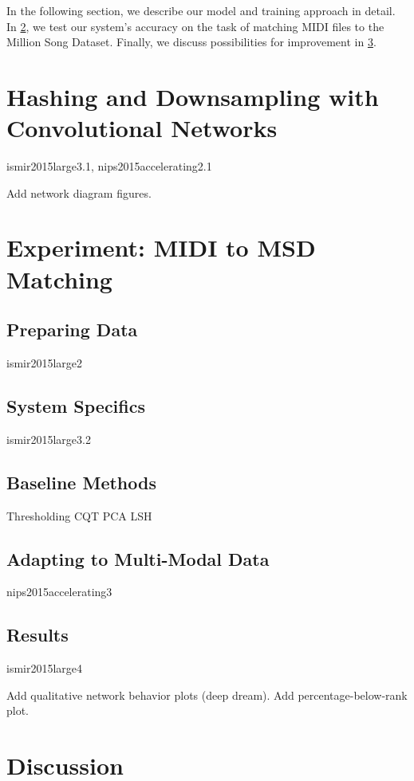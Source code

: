 In the following section, we describe our model and training approach in detail.
In \cref{sec:dhs_experiment}, we test our system's accuracy on the task of matching MIDI files to the Million Song Dataset.
Finally, we discuss possibilities for improvement in \cref{sec:dhs_discussion}.

\section{Hashing and Downsampling with Convolutional Networks}


ismir2015large3.1, nips2015accelerating2.1

Add network diagram figures.

\section{Experiment: MIDI to MSD Matching}
\label{sec:dhs_experiment}

\subsection{Preparing Data}

ismir2015large2

\subsection{System Specifics}

ismir2015large3.2

\subsection{Baseline Methods}

Thresholding CQT PCA
LSH

\subsection{Adapting to Multi-Modal Data}
\label{sec:multimodal}

nips2015accelerating3

\subsection{Results}

ismir2015large4

Add qualitative network behavior plots (deep dream).
Add percentage-below-rank plot.

\section{Discussion}
\label{sec:dhs_discussion}
